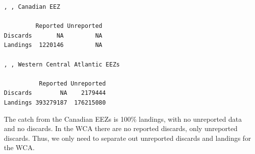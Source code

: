 \documentclass[
  letterpaper,
  oneside,
  open=any]{scrbook}
\newenvironment{Shaded}{\begin{snugshade}}{\end{snugshade}}
\newcommand{\AttributeTok}[1]{\textcolor[rgb]{0.40,0.45,0.13}{#1}}
\newcommand{\CommentTok}[1]{\textcolor[rgb]{0.37,0.37,0.37}{#1}}
\newcommand{\FunctionTok}[1]{\textcolor[rgb]{0.28,0.35,0.67}{#1}}
\newcommand{\NormalTok}[1]{\textcolor[rgb]{0.00,0.23,0.31}{#1}}
\newcommand{\OtherTok}[1]{\textcolor[rgb]{0.00,0.23,0.31}{#1}}
\newcommand{\SpecialCharTok}[1]{\textcolor[rgb]{0.37,0.37,0.37}{#1}}
\newcommand{\StringTok}[1]{\textcolor[rgb]{0.13,0.47,0.30}{#1}}
\begin{document}
\begin{Shaded}
\end{Shaded}

\begin{verbatim}
, , Canadian EEZ

         Reported Unreported
Discards       NA         NA
Landings  1220146         NA

, , Western Central Atlantic EEZs

          Reported Unreported
Discards        NA    2179444
Landings 393279187  176215080
\end{verbatim}

The catch from the Canadian EEZs is 100\% landings, with no unreported
data and no discards. In the WCA there are no reported discards, only
unreported discards. Thus, we only need to separate out unreported
discards and landings for the WCA.
\end{document}
